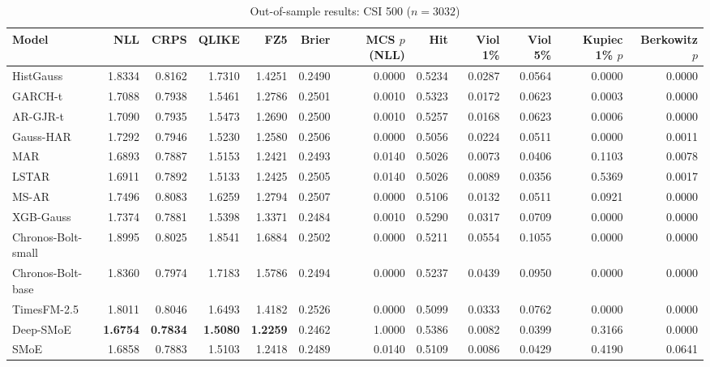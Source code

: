 \begin{table}[!htbp]\centering\scriptsize
\caption{Out-of-sample results: CSI 500 ($n=3032$)}\label{tab:asset_csi500}
\begin{adjustbox}{max width=\textwidth}
\begin{tabular}{lrrrrrrrrrrr}
\toprule
Model & NLL & CRPS & QLIKE & FZ5 & Brier & MCS $p$ (NLL) & Hit & Viol 1\% & Viol 5\% & Kupiec 1\% $p$ & Berkowitz $p$\\
\midrule
HistGauss & 1.8334 & 0.8162 & 1.7310 & 1.4251 & 0.2490 & 0.0000 & 0.5234 & 0.0287 & 0.0564 & 0.0000 & 0.0000\\
GARCH-t & 1.7088 & 0.7938 & 1.5461 & 1.2786 & 0.2501 & 0.0010 & 0.5323 & 0.0172 & 0.0623 & 0.0003 & 0.0000\\
AR-GJR-t & 1.7090 & 0.7935 & 1.5473 & 1.2690 & 0.2500 & 0.0010 & 0.5257 & 0.0168 & 0.0623 & 0.0006 & 0.0000\\
Gauss-HAR & 1.7292 & 0.7946 & 1.5230 & 1.2580 & 0.2506 & 0.0000 & 0.5056 & 0.0224 & 0.0511 & 0.0000 & 0.0011\\
MAR & 1.6893 & 0.7887 & 1.5153 & 1.2421 & 0.2493 & 0.0140 & 0.5026 & 0.0073 & 0.0406 & 0.1103 & 0.0078\\
LSTAR & 1.6911 & 0.7892 & 1.5133 & 1.2425 & 0.2505 & 0.0140 & 0.5026 & 0.0089 & 0.0356 & 0.5369 & 0.0017\\
MS-AR & 1.7496 & 0.8083 & 1.6259 & 1.2794 & 0.2507 & 0.0000 & 0.5106 & 0.0132 & 0.0511 & 0.0921 & 0.0000\\
XGB-Gauss & 1.7374 & 0.7881 & 1.5398 & 1.3371 & 0.2484 & 0.0010 & 0.5290 & 0.0317 & 0.0709 & 0.0000 & 0.0000\\
Chronos-Bolt-small & 1.8995 & 0.8025 & 1.8541 & 1.6884 & 0.2502 & 0.0000 & 0.5211 & 0.0554 & 0.1055 & 0.0000 & 0.0000\\
Chronos-Bolt-base & 1.8360 & 0.7974 & 1.7183 & 1.5786 & 0.2494 & 0.0000 & 0.5237 & 0.0439 & 0.0950 & 0.0000 & 0.0000\\
TimesFM-2.5 & 1.8011 & 0.8046 & 1.6493 & 1.4182 & 0.2526 & 0.0000 & 0.5099 & 0.0333 & 0.0762 & 0.0000 & 0.0000\\
Deep-SMoE & \textbf{1.6754} & \textbf{0.7834} & \textbf{1.5080} & \textbf{1.2259} & 0.2462 & 1.0000 & 0.5386 & 0.0082 & 0.0399 & 0.3166 & 0.0000\\
SMoE & 1.6858 & 0.7883 & 1.5103 & 1.2418 & 0.2489 & 0.0140 & 0.5109 & 0.0086 & 0.0429 & 0.4190 & 0.0641\\
\bottomrule
\end{tabular}
\end{adjustbox}
\end{table}